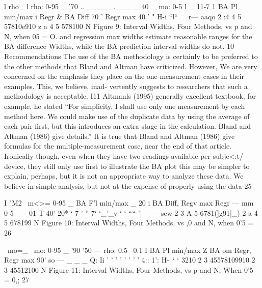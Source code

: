 l rho_ l rho: 0-95 _
'70
 .. _____.___ _ 40
_ mo: 0-5 l _ 11-7 1
 BA Pl min/max
i Regr & BA Diff
70 ’ Regr max
40 ' "
H-i “l“\ ~~r—
aaqo 2 :4 4 5 57810e910 z a 4 5 578100
N
Figure 9: Interval Widths, Four Methods, vs p and N, when 05 = O.
and regression max widths estimate reasonable ranges for the BA difference Widths,
while the BA prediction interval widths do not.
10 Recommendations
The use of the BA methodology is certainly to be preferred to the other methods that
Bland and Altman have criticized. However, We are very concerned on the emphasis
they place on the one-measurement cases in their examples. This, we believe, inad-
vertently suggests to researchers that such a methodology is acceptable. I11 Altmanls
(1995) generally excellent textbook, for example, he stated “For simplicity, I shall
use only one measurement by each method here. We could make use of the duplicate
data by using the average of each pair ﬁrst, but this introduces an extra stage in the
calculation. Bland and Altman (1986) give details.”
It is true that Bland and Altman (1986) give formulas for the multiple-measurement
case, near the end of that article. Ironically though, even when they have two readings
available per subje<:t/ device, they still only use ﬁrst to illustrate the BA plot this
may be simpler to explain, perhaps, but it is not an appropriate way to analyze these
data. We believe in simple analysis, but not at the expense of properly using the data
25



I "M2 \ m<>= 0-95 _
 BA F'l min/max _ 20
i BA Diff, Regv max
Regr
— mm 0-5 \ — 01 T
40'
20* ‘ 7 ' ” 7‘
‘_'_v ‘ ‘ ““-'|~\ \ \ -
sew 2 3 A 5 6781(]g91|_) 2 a 4 5 678199
N
Figure 10: Interval Widths, Four Methods, vs ,0 and N, when 0'5 =
26



\ mo=_ \ mo: 0-95 _
'90
'50
— rho: 0.5 \ 0.1 I
 BA Pl min/max
Z BA om
Regr, Regr max
90'
so — _ _ _ Q: Ii  ’ ’ ’ ’ ’ ’ ’ ’ 4:: 1': 
H-\ ‘  ‘ 
3210 2 3 45578109910 2 3 45512100
N
Figure 11: Interval Widths, Four Methods, vs p and N, When 0'5 = 0,;
27



